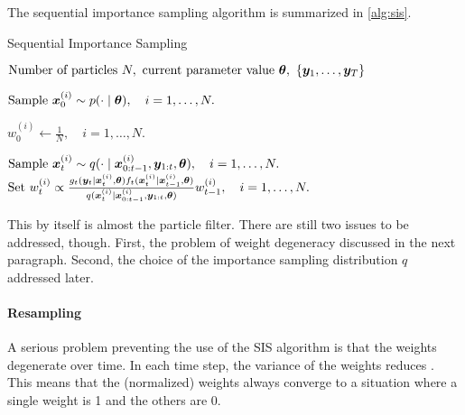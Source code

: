 The sequential importance sampling algorithm is summarized in \autoref{alg:sis}.
\begin{algorithm}[ht]
    \caption{Sequential Importance Sampling}
    \label{alg:sis}
    \begin{algorithmic}[1]
        \Input $\text{Number of particles } N,\ \text{current parameter value } \btheta,\ \left\{\by_1, \ldots, \by_T\right\}$
        
        \State $\text{Sample } \bm{x}_0^{(i)} \sim p(\cdot \mid \bm{\theta}), \quad i = 1, \ldots, N.$ 
        
        \State $w_0^{(i)} \gets \frac{1}{N}, \quad i = 1, \ldots, N.$ 
        
            \State $\text{Sample } \bm{x}_t^{(i)} \sim q(\cdot \mid \bm{x}_{0:t-1}^{(i)}, \bm{y}_{1:t}, \bm{\theta}), \quad i = 1, \ldots, N.$ 
            \State $\text{Set } w_t^{(i)} \propto \frac{g_t(\bm{y}_t \mid \bm{x}_t^{(i)}, \bm{\theta}) f_t(\bm{x}_t^{(i)} \mid \bm{x}_{t-1}^{(i)}, \bm{\theta})}{q(\bm{x}_t^{(i)} \mid \bm{x}_{0:t-1}^{(i)}, \bm{y}_{1:t}, \bm{\theta})} w_{t-1}^{(i)}, \quad i = 1, \ldots, N.$ 
        \EndFor
    \end{algorithmic}
\end{algorithm}
This by itself is almost the particle filter. There are still two issues to be addressed, though. First, the problem of weight degeneracy discussed in the next paragraph. Second, the choice of the importance sampling distribution $q$ addressed later.


\paragraph{Resampling}
A serious problem preventing the use of the SIS algorithm is that the weights degenerate over time. In each time step, the variance of the weights reduces \citep{particle-filter}. This means that the (normalized) weights always converge to a situation where a single weight is 1 and the others are 0.

